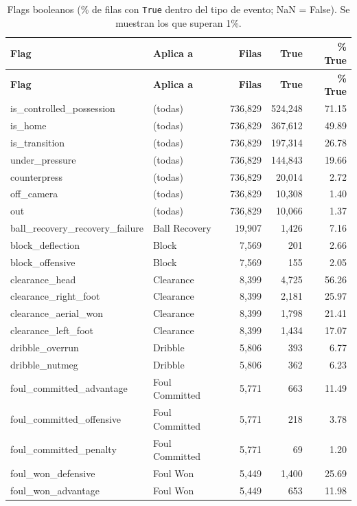 {\scriptsize
\begin{longtable}{llrrr}
\caption{Flags booleanos (\% de filas con \texttt{True} dentro del tipo de evento; NaN = False). Se muestran los que superan 1\%.}\label{tab:events_bool}\\
\toprule
\textbf{Flag} & \textbf{Aplica a} & \textbf{Filas} & \textbf{True} & \textbf{\% True} \\
\midrule
\endfirsthead
\toprule
\textbf{Flag} & \textbf{Aplica a} & \textbf{Filas} & \textbf{True} & \textbf{\% True} \\
\midrule
\endhead
\bottomrule
\endfoot
is\_controlled\_possession & (todas) & 736,829 & 524,248 & 71.15 \\
is\_home & (todas) & 736,829 & 367,612 & 49.89 \\
is\_transition & (todas) & 736,829 & 197,314 & 26.78 \\
under\_pressure & (todas) & 736,829 & 144,843 & 19.66 \\
counterpress & (todas) & 736,829 & 20,014 & 2.72 \\
off\_camera & (todas) & 736,829 & 10,308 & 1.40 \\
out & (todas) & 736,829 & 10,066 & 1.37 \\
ball\_recovery\_recovery\_failure & Ball Recovery & 19,907 & 1,426 & 7.16 \\
block\_deflection & Block & 7,569 & 201 & 2.66 \\
block\_offensive & Block & 7,569 & 155 & 2.05 \\
clearance\_head & Clearance & 8,399 & 4,725 & 56.26 \\
clearance\_right\_foot & Clearance & 8,399 & 2,181 & 25.97 \\
clearance\_aerial\_won & Clearance & 8,399 & 1,798 & 21.41 \\
clearance\_left\_foot & Clearance & 8,399 & 1,434 & 17.07 \\
dribble\_overrun & Dribble & 5,806 & 393 & 6.77 \\
dribble\_nutmeg & Dribble & 5,806 & 362 & 6.23 \\
foul\_committed\_advantage & Foul Committed & 5,771 & 663 & 11.49 \\
foul\_committed\_offensive & Foul Committed & 5,771 & 218 & 3.78 \\
foul\_committed\_penalty & Foul Committed & 5,771 & 69 & 1.20 \\
foul\_won\_defensive & Foul Won & 5,449 & 1,400 & 25.69 \\
foul\_won\_advantage & Foul Won & 5,449 & 653 & 11.98 \\

\end{longtable}}
